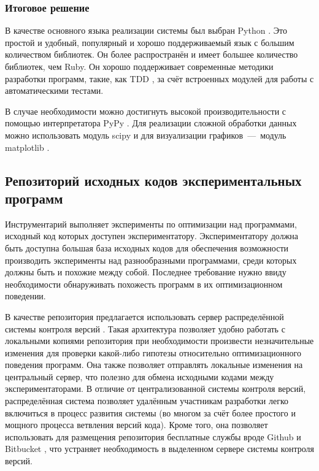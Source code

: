 \subsubsection{Итоговое решение}
В качестве основного языка реализации системы был выбран Python \cite{python}. Это простой и удобный, популярный и хорошо поддерживаемый язык с большим количеством библиотек. Он более распространён \cite{langpop} и имеет большее количество библиотек, чем Ruby. Он хорошо поддерживает современные методики разработки программ, такие, как TDD \cite{tdd}, за счёт встроенных модулей для работы с автоматическими тестами.

В случае необходимости можно достигнуть высокой производительности с помощью интерпретатора PyPy \cite{pypy}. Для реализации сложной обработки данных можно использовать модуль scipy \cite{scipy} и для визуализации \mbox{графиков --- модуль} matplotlib \cite{matplotlib}.


\subsection{Репозиторий исходных кодов экспериментальных программ}
Инструментарий выполняет эксперименты по оптимизации над программами, исходный код которых доступен экспериментатору. Экспериментатору должна быть доступна большая база исходных кодов для обеспечения возможности производить эксперименты над разнообразными программами, среди которых должны быть и похожие между собой. Последнее требование нужно ввиду необходимости обнаруживать похожесть программ в их оптимизационном поведении.

В качестве репозитория предлагается использовать сервер распределённой системы контроля версий \cite{distributed-vcs}. Такая архитектура позволяет удобно работать с локальными копиями репозитория при необходимости произвести незначительные изменения для проверки какой-либо гипотезы относительно оптимизационного поведения программ. Она также позволяет отправлять локальные изменения на центральный сервер, что полезно для обмена исходными кодами между экспериментаторами. В отличие от централизованной системы контроля версий, распределённая система позволяет удалённым участникам разработки легко включиться в процесс развития системы (во многом за счёт более простого и мощного процесса ветвления версий кода). Кроме того, она позволяет использовать для размещения репозитория бесплатные службы вроде {Github} \cite{github} и {Bitbucket} \cite{bitbucket}, что устраняет необходимость в выделенном сервере системы контроля версий.

